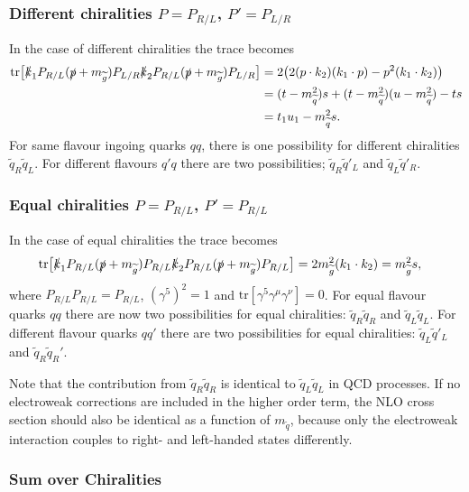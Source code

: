 \documentclass[twoside,english]{uiofysmaster}
\begin{document}
{\subsubsection{Different chiralities $P=P_{R/L}$, $P'=P_{L/R}$}
In the case of different chiralities the trace becomes
\begin{align*}
\text{tr} \big[ 
\slashed{k}_1 P_{R/L} (\slashed{p} + m_{\widetilde{g}}) P_{L/R} \slashed{k}_2 P_{R/L} (\slashed{p} + m_{\widetilde{g}}) P_{L/R} \big]
&= 2 \big(
2 (p \cdot k_2) (k_1 \cdot p) - p^2 (k_1 \cdot k_2)\big)\\
& = (t-m_{\widetilde{q}}^2)s + (t-m_{\widetilde{q}}^2)(u-m_{\widetilde{q}}^2)-  ts\\
&=  t_1u_1 -m_{\widetilde{q}}^2s.
\end{align*}
For same flavour ingoing quarks $qq$, there is one possibility for different chiralities $\widetilde{q}_R\widetilde{q}_L$. For different flavours $q'q$ there are two possibilities; $ \widetilde{q}_R \widetilde{q}'_L$ and $\widetilde{q}_L \widetilde{q}'_R$.  


\subsubsection{Equal chiralities $P=P_{R/L}$, $P'=P_{R/L}$}
In the case of equal chiralities the trace becomes
\begin{align*}
\text{tr} \big[ 
\slashed{k}_1 P_{R/L} (\slashed{p} + m_{\widetilde{g}}) P_{R/L} \slashed{k}_2 P_{R/L} (\slashed{p} + m_{\widetilde{g}}) P_{R/L} \big]&= 2  m_{\widetilde{g}}^2 (k_1 \cdot k_2)= m_{\widetilde{g}}^2 s,
\end{align*}
where $P_{R/L}P_{R/L} = P_{R/L}$, $(\gamma^5)^2 = 1$ and $\text{tr}[\gamma^5 \gamma^{\mu} \gamma^{\nu}]=0$. For equal flavour quarks $qq$ there are now two possibilities for equal chiralities: $\widetilde{q}_R \widetilde{q}_R$ and $ \widetilde{q}_L \widetilde{q}_L$. For different flavour quarks $qq'$ there are two possibilities for equal chiralities: $ \widetilde{q}_L \widetilde{q}'_L$ and $\widetilde{q}_R \widetilde{q}_R'$. 

Note that the contribution from $\widetilde{q}_R \widetilde{q}_R$ is identical to $\widetilde{q}_L \widetilde{q}_L$ in QCD processes. If no electroweak corrections are included in the higher order term, the NLO cross section should also be identical as a function of $m_{\widetilde{q}}$, because only the electroweak interaction couples to right- and left-handed states differently. 

\subsubsection{Sum over Chiralities}

}
\end{document}
